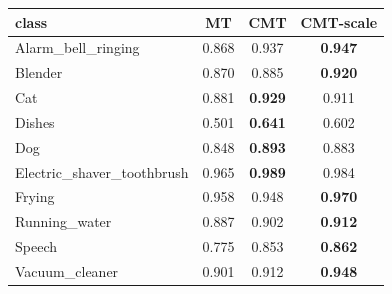 \begin{tabular}{l c c c}
\toprule
class & MT & CMT & CMT-scale \\
\midrule
Alarm\_bell\_ringing & 0.868 & 0.937 & \textbf{0.947} \\
Blender & 0.870 & 0.885 & \textbf{0.920} \\
Cat & 0.881 & \textbf{0.929} & 0.911 \\
Dishes & 0.501 & \textbf{0.641} & 0.602 \\
Dog & 0.848 & \textbf{0.893} & 0.883 \\
Electric\_shaver\_toothbrush & 0.965 & \textbf{0.989} & 0.984 \\
Frying & 0.958 & 0.948 & \textbf{0.970} \\
Running\_water & 0.887 & 0.902 & \textbf{0.912} \\
Speech & 0.775 & 0.853 & \textbf{0.862} \\
Vacuum\_cleaner & 0.901 & 0.912 & \textbf{0.948} \\
\bottomrule
\end{tabular}
